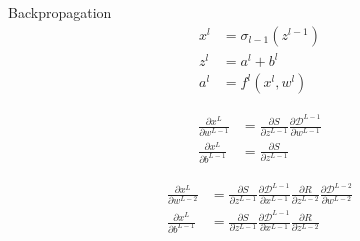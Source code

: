 \documentclass[12pt]{article} %
\begin{document}
\begin{section}{Backpropagation}
\begin{align}
x^{l} &= \sigma_{l-1}(z^{l-1}) \\
z^{l} &= a^{l} + b^{l} \\
a^{l} &= f^{l}(x^{l},w^{l})
\end{align}

\begin{align}
\frac{\partial x^{L}}{\partial w^{L-1}} &= \frac{\partial S}{\partial z^{L-1}}\frac{\partial \mathcal{D}^{L-1}}{\partial w^{L-1}} \\
\frac{\partial x^{L}}{\partial b^{L-1}} &= \frac{\partial S}{\partial z^{L-1}}
\end{align}

\begin{align}
\frac{\partial x^{L}}{\partial w^{L-2}} &= \frac{\partial S}{\partial z^{L-1}}\frac{\partial \mathcal{D}^{L-1}}{\partial x^{L-1}}\frac{\partial R}{\partial z^{L-2}}\frac{\partial \mathcal{D}^{L-2}}{\partial w^{L-2}} \\
\frac{\partial x^{L}}{\partial b^{L-1}} &= \frac{\partial S}{\partial z^{L-1}}\frac{\partial \mathcal{D}^{L-1}}{\partial x^{L-1}}\frac{\partial R}{\partial z^{L-2}}
\end{align}
\end{section}
\end{document}
